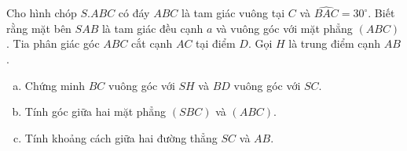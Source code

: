 \begin{bt}%
	Cho hình chóp $S.ABC$ có đáy $ABC$ là tam giác vuông tại $C$ và $\widehat{BAC} = 30^\circ$. Biết rằng mặt bên $SAB$ là tam giác đều cạnh $a$ và vuông góc với mặt phẳng $(ABC)$. Tia phân giác góc $ABC$ cắt cạnh $AC$ tại điểm $D$. Gọi $H$ là trung điểm cạnh $AB$.
	\begin{enumerate}[a)]
		\item Chứng minh $BC$ vuông góc với $SH$ và $BD$ vuông góc với $SC$.
		\item  Tính góc giữa hai mặt phẳng $(SBC)$ và $(ABC)$.
		\item  Tính khoảng cách giữa hai đường thẳng $SC$ và $AB$.
	\end{enumerate}
\end{bt}
